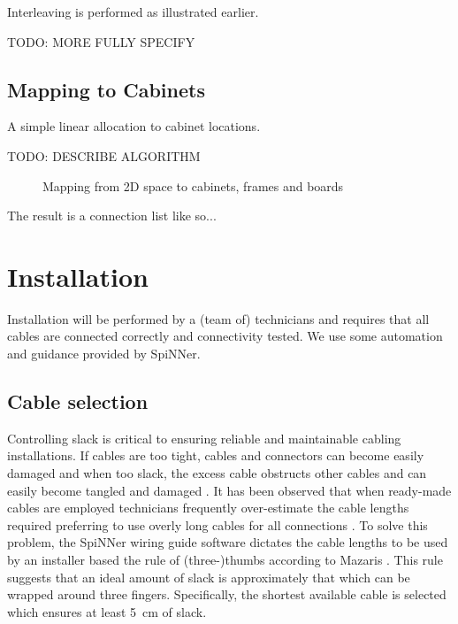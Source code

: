 			Interleaving is performed as illustrated earlier.
			
			TODO: MORE FULLY SPECIFY
		
		\subsection{Mapping to Cabinets}
			
			A simple linear allocation to cabinet locations.
			
			TODO: DESCRIBE ALGORITHM
			
			\begin{figure}
				\center
				
				
				\caption{Mapping from 2D space to cabinets, frames and boards}
				\label{fig:cabinetisation}
			\end{figure}
			
			The result is a connection list like so...
		
	\section{Installation}
		
		Installation will be performed by a (team of) technicians and requires that
		all cables are connected correctly and connectivity tested. We use some
		automation and guidance provided by SpiNNer.
		
		\subsection{Cable selection}
			
			Controlling slack is critical to ensuring reliable and maintainable
			cabling installations. If cables are too tight, cables and connectors can
			become easily damaged and when too slack, the excess cable obstructs
			other cables and can easily become tangled and damaged \cite{cisco07}. It
			has been observed that when ready-made cables are employed technicians
			frequently over-estimate the cable lengths required preferring to use
			overly long cables for all connections \cite{mazaris97}. To solve this
			problem, the SpiNNer wiring guide software dictates the cable lengths to
			be used by an installer based the rule of (three-)thumbs according to
			Mazaris \cite{mazaris97}. This rule suggests that an ideal amount of
			slack is approximately that which can be wrapped around three fingers.
			Specifically, the shortest available cable is selected which ensures at
			least \SI{5}{\centi\meter} of slack.
			
